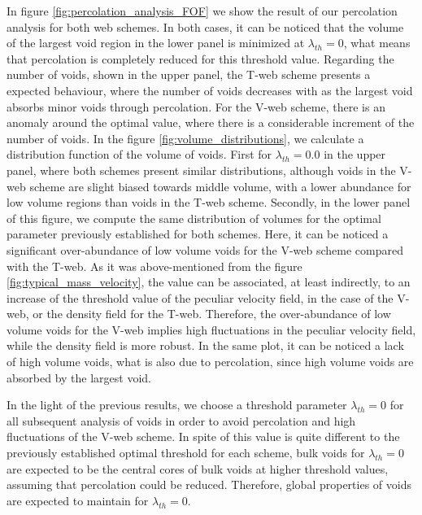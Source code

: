 \documentclass[a4,useAMS,usenatbib,usegraphicx]{latex/mn2e}
\begin{document}
In figure \ref{fig:percolation_analysis_FOF} we show the result of our 
percolation analysis for both web schemes. In both cases, it can be 
noticed that the volume of the largest void region in the lower panel is 
minimized at $\lambda_{th} = 0$, what means that percolation is completely 
reduced for this threshold value. Regarding the number of voids, shown in 
the upper panel, the T-web scheme presents a expected behaviour, where the 
number of voids decreases with \lth as the largest void absorbs minor 
voids through percolation. For the V-web scheme, there is an anomaly 
around the optimal \lth value, where there is a considerable increment of 
the number of voids. In the figure \ref{fig:volume_distributions}, we 
calculate a distribution function of the volume of voids. First for 
$\lambda_{th}=0.0$ in the upper panel, where both schemes present similar 
distributions, although voids in the V-web scheme are slight biased 
towards middle volume, with a lower abundance for low volume regions than 
voids in the T-web scheme. Secondly, in the lower panel of this figure, we 
compute the same distribution of volumes for the optimal parameter 
previously established for both schemes. Here, it can be noticed a 
significant over-abundance of low volume voids for the V-web scheme 
compared with the T-web. As it was above-mentioned from the figure 
\ref{fig:typical_mass_velocity}, the \lth value can be associated, at 
least indirectly, to an increase of the threshold value of the peculiar 
velocity field, in the case of the V-web, or the density field for the 
T-web. Therefore, the over-abundance of low volume voids for the V-web 
implies high fluctuations in the peculiar velocity field, while the 
density field is more robust. In the same plot, it can be noticed a lack 
of high volume voids, what is also due to percolation, since high volume 
voids are absorbed by the largest void.


In the light of the previous results, we choose a threshold parameter 
$\lambda_{th} = 0$ for all subsequent analysis of voids in order to avoid
percolation and high fluctuations of the V-web scheme. In spite of this 
value is quite different to the previously established optimal threshold
for each scheme, bulk voids for $\lambda_{th} = 0$ are expected to be 
the central cores of bulk voids at higher threshold values, assuming that 
percolation could be reduced. Therefore, global properties of voids are 
expected to maintain for $\lambda_{th} = 0$.



\end{document}
